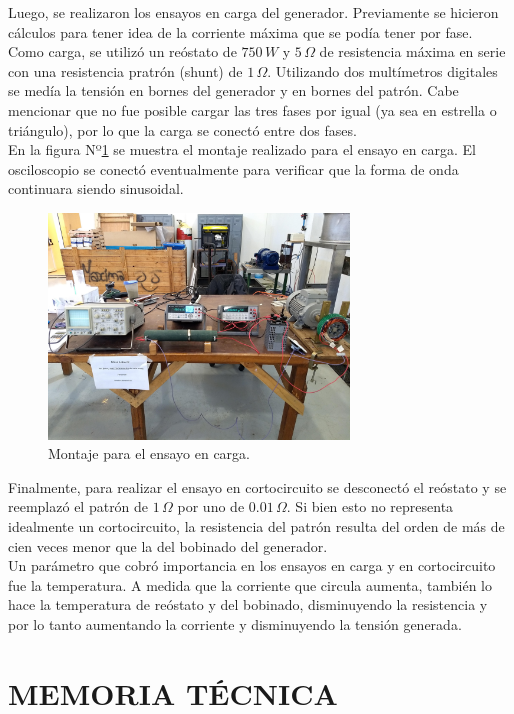 \documentclass[a4paper,11pt,twoside]{IT-CNEA}
\begin{document}
\par Luego, se realizaron los ensayos en carga del generador. Previamente se hicieron cálculos para tener idea de la corriente máxima que se podía tener por fase. Como carga, se utilizó un reóstato de $750\,W$ y $5\,\varOmega$ de resistencia máxima en serie con una resistencia pratrón (shunt) de $1\,\varOmega$. Utilizando dos multímetros digitales se medía la tensión en bornes del generador y en bornes del patrón. Cabe mencionar que no fue posible cargar las tres fases por igual (ya sea en estrella o triángulo), por lo que la carga se conectó entre dos fases. 
\\En la figura Nº\ref{fig:EnsayoCarga} se muestra el montaje realizado para el ensayo en carga. El osciloscopio se conectó eventualmente para verificar que la forma de onda continuara siendo sinusoidal.
\begin{figure}[h!]
\centering
\includegraphics[width=8cm]{Figuras/EnsayoCarga.jpg}
\caption{Montaje para el ensayo en carga.}
\label{fig:EnsayoCarga}
\end{figure}
\par Finalmente, para realizar el ensayo en cortocircuito se desconectó el reóstato y se reemplazó el patrón de $1\,\varOmega$ por uno de $0.01\,\varOmega$. Si bien esto no representa idealmente un cortocircuito, la resistencia del patrón resulta del orden de más de cien veces menor que la del bobinado del generador.
\\Un parámetro que cobró importancia en los ensayos en carga y en cortocircuito fue la temperatura. A medida que la corriente que circula aumenta, también lo hace la temperatura de reóstato y del bobinado, disminuyendo la resistencia y por lo tanto aumentando la corriente y disminuyendo la tensión generada. 
\newpage
\section{MEMORIA TÉCNICA}
\end{document}
